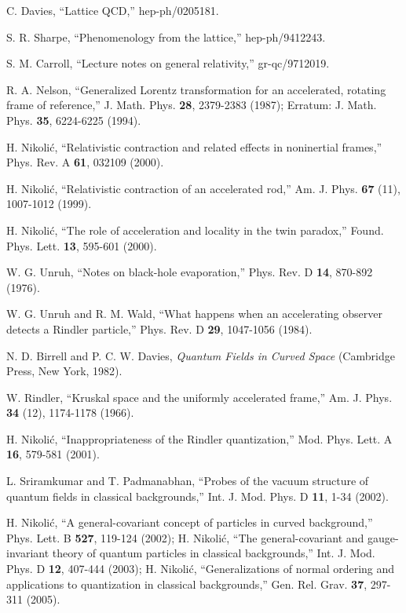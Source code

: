 \documentclass[12pt]{article}
\begin{document}
\begin{thebibliography}{99}
C. Davies,
``Lattice QCD,''
hep-ph/0205181.

S. R. Sharpe,
``Phenomenology from the lattice,''
hep-ph/9412243.

S. M. Carroll,
``Lecture notes on general relativity,''
gr-qc/9712019.

R. A. Nelson, 
``Generalized Lorentz transformation for an accelerated, 
rotating frame of reference,''
J. Math. Phys. {\bf 28}, 2379-2383 (1987);
Erratum: J. Math. Phys. {\bf 35}, 6224-6225 (1994).  

H. Nikoli\'c, 
``Relativistic contraction and related effects in noninertial
frames,''
Phys. Rev. A {\bf 61}, 032109 (2000).

H. Nikoli\'c,
``Relativistic contraction of an accelerated rod,''
Am. J. Phys. {\bf 67} (11), 1007-1012 (1999).

H. Nikoli\'c,
``The role of acceleration and locality in the twin paradox,''
Found. Phys. Lett. {\bf 13}, 595-601 (2000).

W. G. Unruh,
``Notes on black-hole evaporation,''
Phys. Rev. D {\bf 14}, 870-892 (1976).

W. G. Unruh and R. M. Wald,
``What happens when an accelerating observer detects a Rindler 
particle,''
Phys. Rev. D {\bf 29}, 1047-1056 (1984). 

N. D. Birrell and P. C. W. Davies, 
{\it Quantum Fields in Curved Space}
(Cambridge Press, New York, 1982). 

W. Rindler,
``Kruskal space and the uniformly accelerated frame,''
Am. J. Phys. {\bf 34} (12), 1174-1178 (1966).

H. Nikoli\'c,
``Inappropriateness of the Rindler quantization,''
Mod. Phys. Lett. A {\bf 16}, 579-581 (2001).

L. Sriramkumar and T. Padmanabhan,
``Probes of the vacuum structure of quantum fields in classical
backgrounds,''
Int. J. Mod. Phys. D {\bf 11}, 1-34 (2002).

H. Nikoli\'c,
``A general-covariant concept of particles in curved background,''
Phys. Lett. B {\bf 527}, 119-124 (2002);
H. Nikoli\'c,
``The general-covariant and gauge-invariant theory of quantum particles in
classical backgrounds,''
Int. J. Mod. Phys. D {\bf 12}, 407-444 (2003);
H. Nikoli\'c,
``Generalizations of normal ordering and applications to quantization in
classical backgrounds,''
Gen. Rel. Grav. {\bf 37}, 297-311 (2005).


\end{thebibliography}
\end{document}

